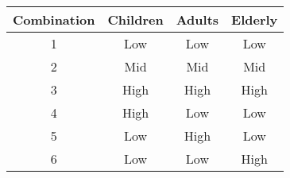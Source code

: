 \begin{tabular}[t]{cccc}
\toprule
\multicolumn{1}{c}{Combination} & Children & Adults & Elderly \\
\midrule
1     & Low   & Low   & Low \\
2     & Mid   & Mid   & Mid \\
3     & High  & High  & High \\
4     & High  & Low   & Low \\
5     & Low   & High  & Low \\
6     & Low   & Low   & High \\
\bottomrule
\end{tabular}%
